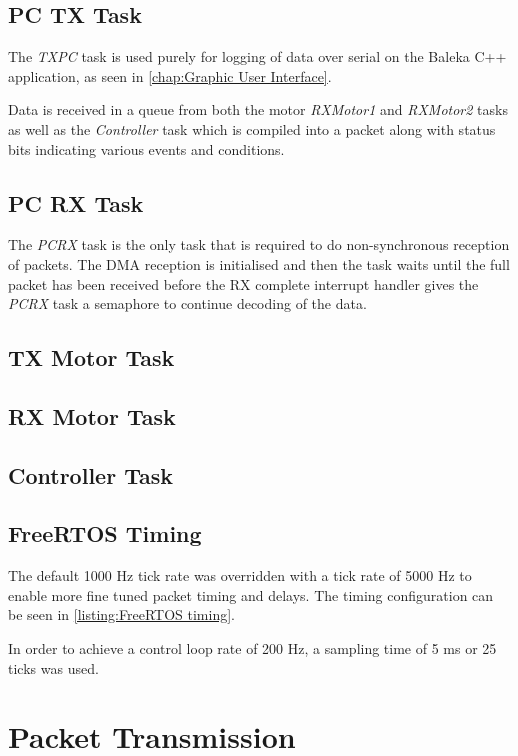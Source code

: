 \subsection{PC TX Task}
The \textit{TXPC} task is used purely for logging of data over serial on the Baleka C++ application, as seen in \cref{chap:Graphic User Interface}. 

Data is received in a queue from both the motor \textit{RXMotor1} and \textit{RXMotor2} tasks as well as the \textit{Controller} task which is compiled into a packet along with status bits indicating various events and conditions. 

\subsection{PC RX Task}
The \textit{PCRX} task is the only task that is required to do non-synchronous reception of packets. The DMA reception is initialised and then the task waits until the full packet has been received before the RX complete interrupt handler gives the \textit{PCRX} task a semaphore to continue decoding of the data.

\subsection{TX Motor Task}
\subsection{RX Motor Task}
\subsection{Controller Task}

\subsection{FreeRTOS Timing}

The default 1000 Hz tick rate was overridden with a tick rate of 5000 Hz to enable more fine tuned packet timing and delays. The timing configuration can be seen in \cref{listing:FreeRTOS timing}. 

In order to achieve a control loop rate of 200 Hz, a sampling time of 5 ms or 25 ticks was used.

\section{Packet Transmission}

